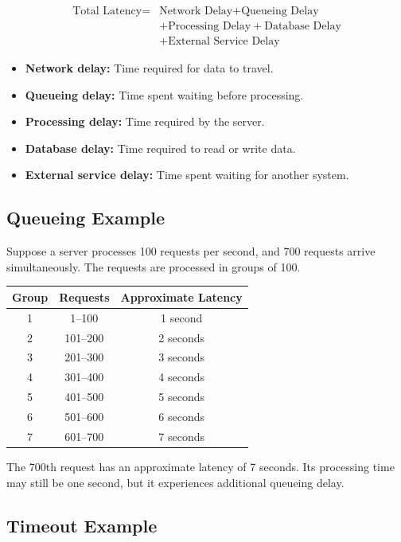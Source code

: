\documentclass[11pt]{article}
\begin{document}
\[
\begin{aligned}
\text{Total Latency}
={}&
\text{Network Delay}
+
\text{Queueing Delay} \\
&+
\text{Processing Delay}
+
\text{Database Delay} \\
&+
\text{External Service Delay}
\end{aligned}
\]

\begin{itemize}
    \item \textbf{Network delay:} Time required for data to travel.
    \item \textbf{Queueing delay:} Time spent waiting before processing.
    \item \textbf{Processing delay:} Time required by the server.
    \item \textbf{Database delay:} Time required to read or write data.
    \item \textbf{External service delay:} Time spent waiting for another system.
\end{itemize}

\subsection*{Queueing Example}

Suppose a server processes 100 requests per second, and 700 requests arrive simultaneously. The requests are processed in groups of 100.

\begin{center}
\begin{tabular}{ccc}
\toprule
\textbf{Group} & \textbf{Requests} & \textbf{Approximate Latency} \\
\midrule
1 & 1--100 & 1 second \\
2 & 101--200 & 2 seconds \\
3 & 201--300 & 3 seconds \\
4 & 301--400 & 4 seconds \\
5 & 401--500 & 5 seconds \\
6 & 501--600 & 6 seconds \\
7 & 601--700 & 7 seconds \\
\bottomrule
\end{tabular}
\end{center}

The 700th request has an approximate latency of 7 seconds. Its processing time may still be one second, but it experiences additional queueing delay.

\subsection*{Timeout Example}
\end{document}
